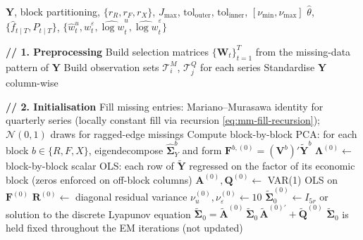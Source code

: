 \documentclass[11pt, a4paper, oneside]{article}
\newcommand{\mL}{\boldsymbol{\Lambda}}
\begin{document}
\begin{algorithm}[H]
\caption{EM algorithm for the Student-$t$ DFM (Part 1 of 2): Preprocessing, Initialisation, and E-step}
\label{alg:em-part1}
\small
\begin{algorithmic}[1]

\Require $\mathbf{Y}$, block partitioning, $\{r_R, r_F, r_X\}$, $J_{\max}$, $\mathrm{tol}_{\text{outer}}$, $\mathrm{tol}_{\text{inner}}$, $[\nu_{\min}, \nu_{\max}]$
\Ensure $\hat{\theta}$, $\{\hat{f}_{t \mid T}, P_{t \mid T}\}$, $\{\hat{w}^u_t, \hat{w}^\varepsilon_t, \widehat{\log w}^u_t, \widehat{\log w}^\varepsilon_t\}$

\vspace{0.3em}
\State \textbf{// 1. Preprocessing}
\State Build selection matrices $\{\mathbf{W}_t\}_{t=1}^T$ from the missing-data pattern of $\mathbf{Y}$
\State Build observation sets $\mathcal{T}^M_i$, $\mathcal{T}^Q_j$ for each series
\State Standardise $\mathbf{Y}$ column-wise

\vspace{0.3em}
\State \textbf{// 2. Initialisation}
\State Fill missing entries: Mariano--Murasawa identity for quarterly series (locally constant fill via recursion \eqref{eq:mm-fill-recursion}); $\mathcal{N}(0,1)$ draws for ragged-edge missings
\State Compute block-by-block PCA: for each block $b \in \{R, F, X\}$, eigendecompose $\widehat{\boldsymbol{\Sigma}}^b_Y$ and form $\mathbf{F}^{b,(0)} = (\mathbf{V}^b)' \tilde{\mathbf{Y}}^b$
\State $\mL^{(0)} \gets$ block-by-block scalar OLS: each row of $\tilde{\mathbf{Y}}$ regressed on the factor of its economic block (zeros enforced on off-block columns)
\State $\mathbf{A}^{(0)}, \mathbf{Q}^{(0)} \gets$ VAR(1) OLS on $\mathbf{F}^{(0)}$
\State $\mathbf{R}^{(0)} \gets$ diagonal residual variance
\State $\nu_u^{(0)}, \nu_\varepsilon^{(0)} \gets 10$
\State $\tilde{\boldsymbol{\Sigma}}_0^{(0)} \gets I_{5r}$ or solution to the discrete Lyapunov equation $\tilde{\boldsymbol{\Sigma}}_0 = \tilde{\mathbf{A}}^{(0)}\, \tilde{\boldsymbol{\Sigma}}_0\, \tilde{\mathbf{A}}^{(0)\prime} + \tilde{\mathbf{Q}}^{(0)}$
\State $\tilde{\boldsymbol{\Sigma}}_0$ is held fixed throughout the EM iterations (not updated)


\end{algorithmic}
\end{algorithm}
\end{document}
